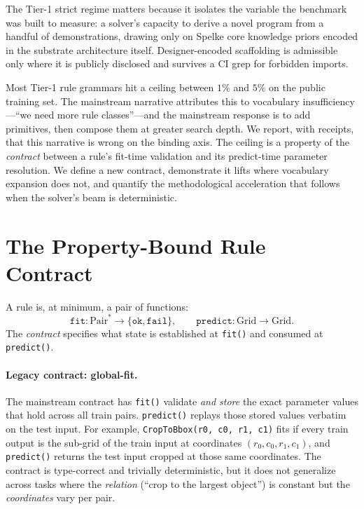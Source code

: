 \documentclass[11pt]{article}
\begin{document}
The Tier-1 strict regime matters because it isolates the variable the
benchmark was built to measure: a solver's capacity to derive a novel
program from a handful of demonstrations, drawing only on Spelke core
knowledge priors \cite{SpelkeKinzler2007} encoded in the substrate
architecture itself. Designer-encoded scaffolding is admissible only
where it is publicly disclosed and survives a CI grep for forbidden
imports.

Most Tier-1 rule grammars hit a ceiling between $1\%$ and $5\%$ on the
public training set. The mainstream narrative attributes this to
vocabulary insufficiency---``we need more rule classes''---and the
mainstream response is to add primitives, then compose them at greater
search depth. We report, with receipts, that this narrative is wrong on
the binding axis. The ceiling is a property of the \emph{contract}
between a rule's fit-time validation and its predict-time
parameter resolution. We define a new contract, demonstrate it lifts
where vocabulary expansion does not, and quantify the methodological
acceleration that follows when the solver's beam is deterministic.

\section{The Property-Bound Rule Contract}
\label{sec:contract}

A rule is, at minimum, a pair of functions:
\[
  \mathtt{fit}: \mathrm{Pair}^{*} \to \{\mathtt{ok}, \mathtt{fail}\},
  \qquad
  \mathtt{predict}: \mathrm{Grid} \to \mathrm{Grid}.
\]
The \emph{contract} specifies what state is established at \texttt{fit()}
and consumed at \texttt{predict()}.

\paragraph{Legacy contract: global-fit.}
The mainstream contract \cite{Hodel2023, Icecuber2020} has \texttt{fit()}
validate \emph{and store} the exact parameter values that hold across all
train pairs. \texttt{predict()} replays those stored values verbatim on
the test input. For example,
\texttt{CropToBbox(r0, c0, r1, c1)} fits if every train output is the
sub-grid of the train input at coordinates $(r_0, c_0, r_1, c_1)$, and
\texttt{predict()} returns the test input cropped at those same
coordinates. The contract is type-correct and trivially deterministic,
but it does not generalize across tasks where the \emph{relation}
(``crop to the largest object'') is constant but the
\emph{coordinates} vary per pair.
\end{document}
